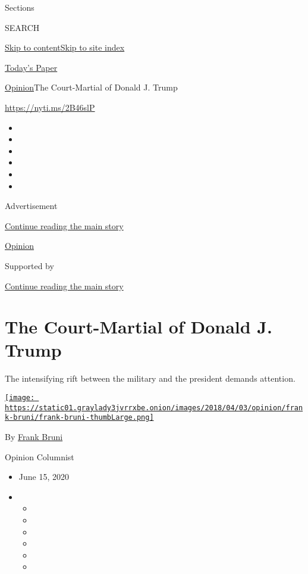 Sections

SEARCH

\protect\hyperlink{site-content}{Skip to
content}\protect\hyperlink{site-index}{Skip to site index}

\href{https://myaccount.nytimes3xbfgragh.onion/auth/login?response_type=cookie\&client_id=vi}{}

\href{https://www.nytimes3xbfgragh.onion/section/todayspaper}{Today's
Paper}

\href{/section/opinion}{Opinion}\textbar{}The Court-Martial of Donald J.
Trump

\url{https://nyti.ms/2B46slP}

\begin{itemize}
\item
\item
\item
\item
\item
\item
\end{itemize}

Advertisement

\protect\hyperlink{after-top}{Continue reading the main story}

\href{/section/opinion}{Opinion}

Supported by

\protect\hyperlink{after-sponsor}{Continue reading the main story}

\hypertarget{the-court-martial-of-donald-j-trump}{%
\section{The Court-Martial of Donald J.
Trump}\label{the-court-martial-of-donald-j-trump}}

The intensifying rift between the military and the president demands
attention.

\href{https://www.nytimes3xbfgragh.onion/by/frank-bruni}{\texttt{[image: https://static01.graylady3jvrrxbe.onion/images/2018/04/03/opinion/frank-bruni/frank-bruni-thumbLarge.png]}}

By \href{https://www.nytimes3xbfgragh.onion/by/frank-bruni}{Frank Bruni}

Opinion Columnist

\begin{itemize}
\item
  June 15, 2020
\item
  \begin{itemize}
  \item
  \item
  \item
  \item
  \item
  \item
  \end{itemize}
\end{itemize}

